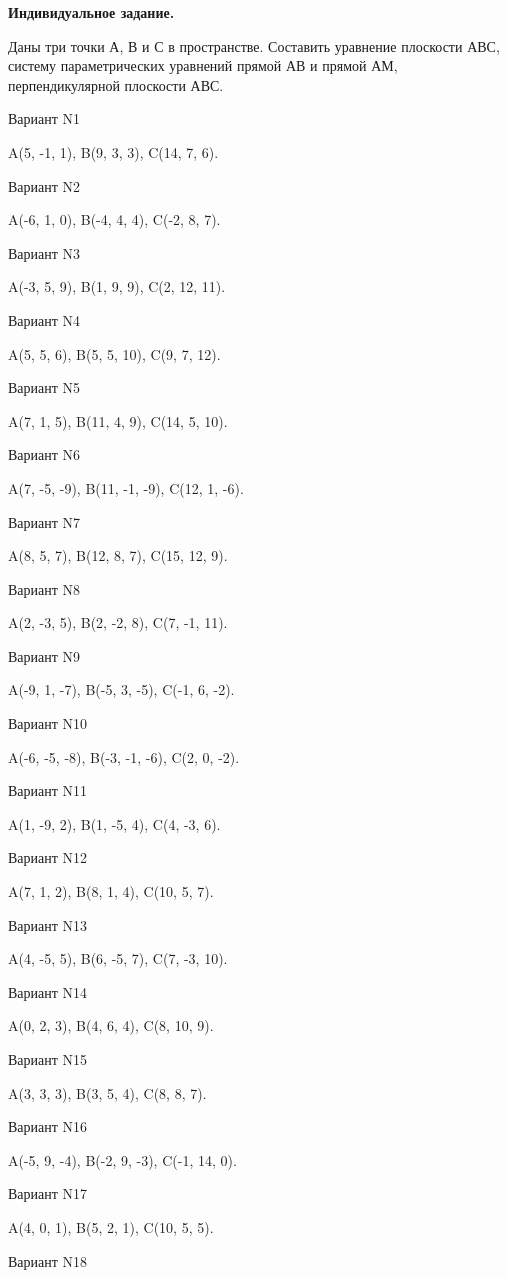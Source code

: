 \documentclass[11pt]{report}
\begin{document}
\pagestyle{empty}

{\bf Индивидуальное задание.}

 Даны три точки А, В и С в пространстве. 
Составить уравнение плоскости АВС, систему параметрических уравнений 
прямой АВ и прямой АМ, перпендикулярной плоскости АВС.

 Вариант N1

A(5, -1, 1), B(9, 3, 3), C(14, 7, 6).

Вариант N2

A(-6, 1, 0), B(-4, 4, 4), C(-2, 8, 7).

Вариант N3

A(-3, 5, 9), B(1, 9, 9), C(2, 12, 11).

Вариант N4

A(5, 5, 6), B(5, 5, 10), C(9, 7, 12).

Вариант N5

A(7, 1, 5), B(11, 4, 9), C(14, 5, 10).

Вариант N6

A(7, -5, -9), B(11, -1, -9), C(12, 1, -6).

Вариант N7

A(8, 5, 7), B(12, 8, 7), C(15, 12, 9).

Вариант N8

A(2, -3, 5), B(2, -2, 8), C(7, -1, 11).

Вариант N9

A(-9, 1, -7), B(-5, 3, -5), C(-1, 6, -2).

Вариант N10

A(-6, -5, -8), B(-3, -1, -6), C(2, 0, -2).

Вариант N11

A(1, -9, 2), B(1, -5, 4), C(4, -3, 6).

Вариант N12

A(7, 1, 2), B(8, 1, 4), C(10, 5, 7).

Вариант N13

A(4, -5, 5), B(6, -5, 7), C(7, -3, 10).

Вариант N14

A(0, 2, 3), B(4, 6, 4), C(8, 10, 9).

Вариант N15

A(3, 3, 3), B(3, 5, 4), C(8, 8, 7).

Вариант N16

A(-5, 9, -4), B(-2, 9, -3), C(-1, 14, 0).

Вариант N17

A(4, 0, 1), B(5, 2, 1), C(10, 5, 5).

Вариант N18
\end{document}
